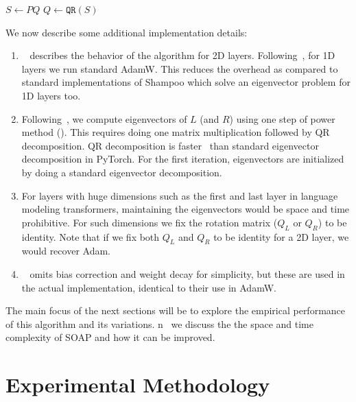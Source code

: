 \documentclass{article} %
\begin{document}
\begin{algorithm}[t]
	
	\begin{algorithmic}[1]
		\STATE $S \gets PQ$
            \STATE $Q \gets \texttt{QR}(S)$
	\end{algorithmic}
	\caption{\texttt{Eigenvectors} function, implemented using power iteration and QR decomposition. Inputs: PSD matrix $P$ and estimate of eigenvectors $Q$. If the estimate was exact we would have $P = Q D Q^T$ where $D$ is the diagonal matrix with eigenvalues.}
	\label{alg:eigenvectors}
\end{algorithm}

We now describe some additional implementation details:
\begin{enumerate}
	\item ~ describes the behavior of the algorithm for 2D layers. Following~\citet{galore}, for 1D layers we run standard AdamW. This reduces the overhead as compared to standard implementations of Shampoo which solve an eigenvector problem for 1D layers too. 
	\item Following~\citet{4bitshampoo}, we compute eigenvectors of $L$ (and $R$) using one step of power method (). This requires doing one matrix multiplication followed by QR decomposition. QR decomposition is faster~\citep{eigh-vs-qr} than standard eigenvector decomposition in PyTorch. For the first iteration, eigenvectors are initialized by doing a standard eigenvector decomposition.  %
	\item For layers with huge dimensions such as the first and last layer in language modeling transformers, maintaining the eigenvectors would be space and time prohibitive. For such dimensions we fix the rotation matrix ($Q_L$ or $Q_R$) to be identity. Note that if we fix both $Q_L$ and $Q_R$ to be identity for a 2D layer, we would recover Adam.
        \item ~ omits bias correction and weight decay for simplicity, but these are used in the actual implementation, identical to their use in AdamW.
\end{enumerate}

The main focus of the next sections will be to explore the empirical performance of this algorithm and its variations. n~ we discuss the the space and time complexity of SOAP and how it can be improved.

\section{Experimental Methodology}
\label{sec:methods}
\end{document}
